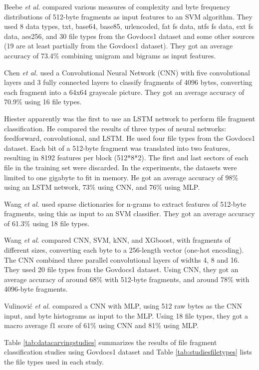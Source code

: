 Beebe \textit{et al.} \cite{beebe_sceadan:_2013}
compared various measures of complexity and byte frequency distributions of 512-byte fragments as input features to an SVM algorithm. They used 8 data types, txt, base64, base85, urlencoded, fat fs data, ntfs fs data, ext fs data, aes256, and
30 file types
from the Govdocs1 dataset and some other sources (19 are at least partially from the Govdocs1 dataset). They got an average accuracy of 73.4\% combining unigram and bigrams as input features.

Chen \textit{et al.} \cite{chen_file_2018}
used a Convolutional Neural Network (CNN) with five convolutional layers and 3 fully connected layers to classify fragments of 4096 bytes, converting each fragment into a 64x64 grayscale picture.
They got an average accuracy of 70.9\% using 16 file types.

Hiester \cite{hiester_file_2018} apparently was the first to use an LSTM network to perform file fragment classification. He compared the results of three types of neural networks: feedforward, convolutional, and LSTM. He used four file types from the Govdocs1 dataset.
Each bit of a 512-byte fragment was translated into two features, resulting in 8192 features per block (512*8*2). The first and last sectors of each file in the training set were discarded. In the experiments, the datasets were limited to one gigabyte to fit in memory. He got an average accuracy of 98\% using an LSTM network, 73\% using CNN, and 76\% using MLP.

Wang \textit{et al.} \cite{wang_sparse_2018} 
used sparse dictionaries for n-grams to extract features of 512-byte fragments, using this as input to an SVM classifier.
They got an average accuracy of 61.3\% using 18 file types.

Wang \textit{et al.} \cite{wang_file_2018}  
compared CNN, SVM, kNN, and XGboost, with fragments of different sizes, converting each byte to a 256-length vector (one-hot encoding). The CNN combined three parallel convolutional layers of widths 4, 8 and 16.
They used 20 file types from the Govdocs1 dataset.
Using CNN, they got an average accuracy of around 68\% with 512-byte fragments, and around 78\% with 4096-byte fragments.

Vulinović \textit{et al.} \cite{vulinovic_neural_2019}
compared a CNN with MLP, using 512 raw bytes as the CNN input, and byte histograms as input to the MLP.
Using 18 file types, they got a macro average f1 score  of 61\% using CNN and 81\% using MLP.

Table \ref{tab:datacarvingstudies} summarizes 
the results of file fragment classification studies using Govdocs1 dataset and Table \ref{tab:studiesfiletypes}
lists the file types used in each study.




